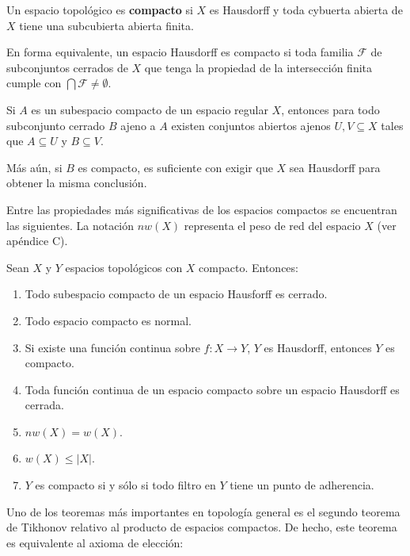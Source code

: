 \documentclass[12pt]{report}
\theoremstyle{largebreak}
\newcommand\abs[1]{\ensuremath{\lvert#1\rvert}}
\newcommand{\cf}[3]{\ensuremath{#1:#2\rightarrow#3}}
\begin{document}
    \begin{mydef}
        Un espacio topológico es \textbf{compacto} si $X$ es Hausdorff y toda cybuerta abierta de $X$ tiene una subcubierta abierta finita.
    \end{mydef}

    \begin{obs}
        En forma equivalente, un espacio Hausdorff es compacto si toda familia $\mathcal{F}$ de subconjuntos cerrados de $X$ que tenga la propiedad de la intersección finita cumple con $\bigcap\mathcal{F}\neq\emptyset$.
    \end{obs}

    \begin{theor}
        Si $A$ es un subespacio compacto de un espacio regular $X$, entonces para todo subconjunto cerrado $B$ ajeno a $A$ existen conjuntos abiertos ajenos $U,V\subseteq X$ tales que $A\subseteq U$ y $B\subseteq V$.

        Más aún, si $B$ es compacto, es suficiente con exigir que $X$ sea Hausdorff para obtener la misma conclusión.
    \end{theor}

    Entre las propiedades más significativas de los espacios compactos se encuentran las siguientes. La notación $nw(X)$ representa el peso de red del espacio $X$ (ver apéndice C).

    \begin{theor}
        Sean $X$ y $Y$ espacios topológicos con $X$ compacto. Entonces:
        \begin{enumerate}
            \item Todo subespacio compacto de un espacio Hausforff es cerrado.
            \item Todo espacio compacto es normal.
            \item Si existe una función continua sobre $\cf{f}{X}{Y}$, $Y$ es Hausdorff, entonces $Y$ es compacto.
            \item Toda función continua de un espacio compacto sobre un espacio Hausdorff es cerrada.
            \item $nw(X)=w(X)$.
            \item $w(X)\leq\abs{X}$.
            \item $Y$ es compacto si y sólo si todo filtro en $Y$ tiene un punto de adherencia.
        \end{enumerate}
    \end{theor}

    Uno de los teoremas más importantes en topología general es el segundo teorema de Tikhonov relativo al producto de espacios compactos. De hecho, este teorema es equivalente al axioma de elección:
\end{document}
